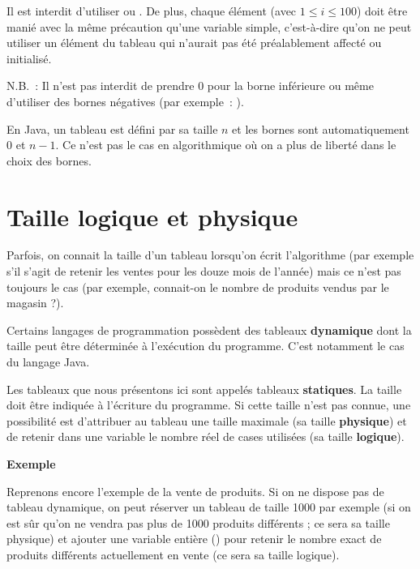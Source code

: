 	Il est interdit d’utiliser  ou
	. De plus, chaque élément
	 (avec $1 \leq i \leq 100$) doit
	être manié avec la même précaution qu’une variable simple, c’est-à-dire
	qu’on ne peut utiliser un élément du tableau qui n’aurait pas été
	préalablement affecté ou initialisé.

	N.B.~: Il n'est pas interdit de prendre 0 pour la borne
	inférieure ou même d'utiliser des bornes négatives
	(par exemple~: ).

	En Java, un tableau est défini par sa taille $n$ et les bornes sont
	automatiquement $0$ et $n-1$. Ce n'est pas le cas en
	algorithmique où on a plus de liberté dans le choix des bornes.

\section{Taille logique et physique}

	Parfois, on connait la taille d'un tableau lorsqu'on
	écrit l'algorithme 
	(par exemple s'il s'agit de retenir les ventes
	pour les douze mois de l'année)
	mais ce n'est pas toujours le cas
	(par exemple, connait-on le nombre de produits vendus 
	par le magasin ?).
	
	Certains langages de programmation possèdent des tableaux
	\textbf{dynamique} dont la taille peut être déterminée
	à l'exécution du programme.
	C'est notamment le cas du langage Java.

	Les tableaux que nous présentons ici
	sont appelés tableaux \textbf{statiques}.
	La taille doit être indiquée à l'écriture du programme.
	Si cette taille n'est pas connue,
	une possibilité est d'attribuer au tableau
	une taille maximale (sa taille \textbf{physique})
	et de retenir dans une variable le nombre réel de cases utilisées
	(sa taille \textbf{logique}).

	\textbf{Exemple}

	Reprenons encore l’exemple de la vente de produits. 
	Si on ne dispose pas de tableau dynamique, on peut réserver
	un tableau de taille 1000 par exemple (si on est sûr qu’on ne vendra
	pas plus de 1000 produits différents ;
	ce sera sa taille physique) 
	et ajouter une variable entière
	() 
	pour retenir le nombre exact de produits différents 
	actuellement en vente
	(ce sera sa taille logique).
	
